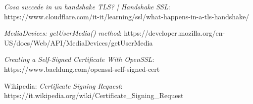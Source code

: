 \documentclass[11pt, a4paper, openany]{book}
\begin{document}
\begin{thebibliography}{9}
 		\emph{Cosa succede in un handshake TLS? | Handshake SSL}: https://www.cloudflare.com/it-it/learning/ssl/what-happens-in-a-tls-handshake/
 		
 		\emph{MediaDevices: getUserMedia() method}: 
 		https://developer.mozilla.org/en-US/docs/Web/API/MediaDevices/getUserMedia
 		
 		\emph{Creating a Self-Signed Certificate With OpenSSL}: 
 		https://www.baeldung.com/openssl-self-signed-cert
 		
 		Wikipedia: \emph{Certificate Signing Request}: 
 		https://it.wikipedia.org/wiki/Certificate\_Signing\_Request
	\end{thebibliography}
 
 	
\end{document}
